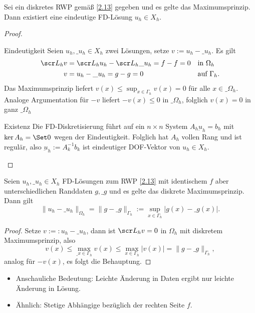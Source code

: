 \begin{kor} \label{2.19}
	Sei ein diskretes RWP gemäß \ref{2.13} gegeben und es gelte das Maximumsprinzip.
	Dann existiert eine eindeutige FD-Lösung $u_h \in X_h$.
	\begin{proof}
		\begin{seg}{Eindeutigkeit}
			Seien $u_h, \_u_h \in X_h$ zwei Lösungen, setze $v := u_h - \_u_h$.
			Es gilt
			\begin{align*}
				\scr L_h v &= \scr L_h u_h - \scr L_h \_u_h = f - f = 0 && \text{in $\Omega_h$} \\
				v &= u_h - \_u_h = g - g = 0 && \text{auf $\Gamma_h$}.
			\end{align*}
			Das Maximumsprinzip liefert $v(x) \le \sup_{x\in\Gamma_h} v(x) = 0$ für alle $x \in \_\Omega_h$.
			Analoge Argumentation für $-v$ liefert $-v(x) \le 0$ in $\_\Omega_h$, folglich $v(x) = 0$ in ganz $\_\Omega_h$
		\end{seg}
		\begin{seg}{Existenz}
			Die FD-Diskretisierung führt auf ein $n \times n$ System $A_h \underbar{u}_h = b_h$ mit $\ker A_h = \Set 0$ wegen der Eindeutigkeit.
			Folglich hat $A_h$ vollen Rang und ist regulär, also $\underbar{u}_h := A_k^{-1} b_k$ ist eindeutiger DOF-Vektor von $u_h \in X_h$.
		\end{seg}
	\end{proof}
\end{kor}

\begin{kor} \label{2.20}
	Seien $u_h, \_u_h \in X_h$ FD-Lösungen zum RWP \ref{2.13} mit identischem $f$ aber unterschiedlichen Randdaten $g, \_g$ und es gelte das diskrete Maximumsprinzip.
	Dann gilt
	\[
		\|u_h - \_u_h\|_{\Omega_h} = \|g-\_g\|_{\Gamma_h} := \sup_{x\in\Gamma_h} |g(x) - \_g(x)|.
	\]
	\begin{proof}
		Setze $v :=: u_h - \_u_h$, dann ist $\scr L_h v = 0$ in $\Omega_h$ mit diskretem Maximumsprinzip, also
		\[
			v(x) \le \max_{\_x \in \Gamma_h} v(x)
			\le \max_{x \in \Gamma_h} |v(x)|
			= \|g - \_g\|_{\Gamma_h},
		\]
		analog für $-v(x)$, es folgt die Behauptung.
	\end{proof}
	\begin{note}
		\begin{itemize}
			\item
				Anschauliche Bedeutung: Leichte Änderung in Daten ergibt nur leichte Änderung in Lösung.
			\item
				Ähnlich: Stetige Abhängige bezüglich der rechten Seite $f$.
		\end{itemize}
	\end{note}
\end{kor}


